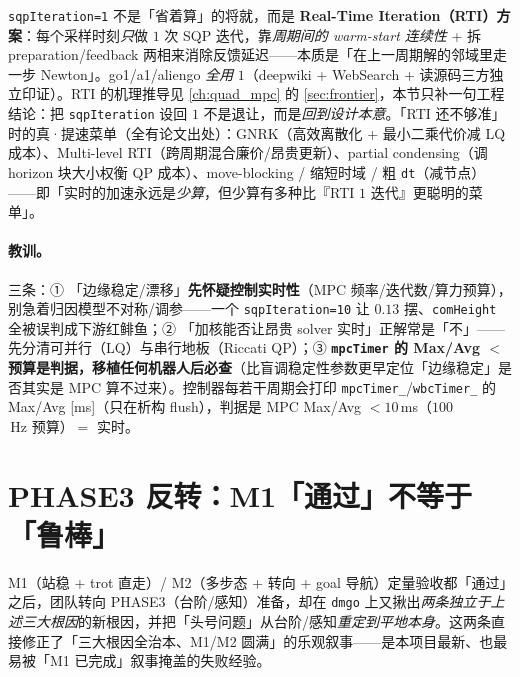 \begin{insight}[\texttt{sqpIteration=1} = RTI = 正确实时设计，不是妥协]\label{ins:qadv-rti}
\texttt{sqpIteration=1} 不是「省着算」的将就，而是 \textbf{Real-Time Iteration（RTI）方案}\cite{diehl2002rti}：每个采样时刻\emph{只}做 $1$ 次 SQP 迭代，靠\emph{周期间的 warm-start 连续性} + 拆 preparation/feedback 两相来消除反馈延迟——本质是「在上一周期解的邻域里走一步 Newton」。go1/a1/aliengo \emph{全用} $1$（deepwiki + WebSearch + 读源码三方独立印证）。RTI 的机理推导见 \cref{ch:quad_mpc} 的 \cref{sec:frontier}，本节只补一句工程结论：把 \texttt{sqpIteration} 设回 $1$ 不是退让，而是\emph{回到设计本意}。「RTI 还不够准」时的真·提速菜单（全有论文出处）：GNRK（高效离散化 + 最小二乘代价减 LQ 成本）、Multi-level RTI（跨周期混合廉价/昂贵更新）、partial condensing（调 horizon 块大小权衡 QP 成本）、move-blocking / 缩短时域 / 粗 \texttt{dt}（减节点）——即「实时的加速永远是\emph{少算}，但少算有多种比『RTI $1$ 迭代』更聪明的菜单」。
\end{insight}

\paragraph{教训。}
三条：① 「边缘稳定/漂移」\textbf{先怀疑控制实时性}（MPC 频率/迭代数/算力预算），别急着归因模型不对称/调参——一个 \texttt{sqpIteration=10} 让 $0.13$ 摆、\texttt{comHeight} 全被误判成下游红鲱鱼；② 「加核能否让昂贵 solver 实时」正解常是「不」——先分清可并行（LQ）与串行地板（Riccati QP）；③ \textbf{\texttt{mpcTimer} 的 Max/Avg $<$ 预算是判据，移植任何机器人后必查}（比盲调稳定性参数更早定位「边缘稳定」是否其实是 MPC 算不过来）。控制器每若干周期会打印 \texttt{mpcTimer\_}/\texttt{wbcTimer\_} 的 Max/Avg [ms]（只在析构 flush），判据是 MPC Max/Avg $<10$\,ms（$100$\,Hz 预算）$=$ 实时。

\section{PHASE3 反转：M1「通过」不等于「鲁棒」}
\label{sec:qadv-phase3}

M1（站稳 + trot 直走）/ M2（多步态 + 转向 + goal 导航）定量验收都「通过」之后，团队转向 PHASE3（台阶/感知）准备，却在 \texttt{dmgo} 上又揪出\emph{两条独立于上述三大根因}的新根因，并把「头号问题」从台阶/感知\emph{重定到平地本身}。这两条直接修正了「三大根因全治本、M1/M2 圆满」的乐观叙事——是本项目最新、也最易被「M1 已完成」叙事掩盖的失败经验。

